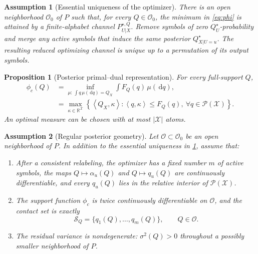 \documentclass[10pt,a4paper]{amsart}
\newtheorem{assumption}{Assumption}
\newtheorem{proposition}{Proposition}
\newcommand{\Pcal}{\mathcal P}
\newcommand{\Scal}{\mathcal S}
\newcommand{\X}{\mathcal X}
\newcommand{\dd}{\,\mathrm d}
\newcommand{\ip}[2]{\left\langle #1,#2\right\rangle}
\begin{document}
\begin{assumption}[Essential uniqueness of the optimizer]
\label{ass:unique}
There is an open neighborhood $\mathcal O_0$ of $P$ such that, for every $Q\in\mathcal O_0$, the minimum in \eqref{eq:phi} is attained by a finite-alphabet channel $P_{U|X}^{\star,Q}$.  Remove symbols of zero $Q_U^{\star}$-probability and merge any active symbols that induce the same posterior $Q_{X|U=u}^{\star}$.  The resulting reduced optimizing channel is unique up to a permutation of its output symbols.
\end{assumption}

\begin{proposition}[Posterior primal--dual representation]
\label{prop:posterior-dual}
For every full-support $Q$,
\begin{align}
\phi_c(Q)
&=\inf_{\mu:\,\int q\,\mu(\dd q)=Q_X}
\int F_Q(q)\,\mu(\dd q),
\label{eq:posterior-primal}\\
&=\max_{\kappa\in\mathbb R^{\X}}
\left\{\ip{Q_X}{\kappa}:\ip{q}{\kappa}\le F_Q(q),\ \forall q\in\Pcal(\X)\right\}.
\label{eq:posterior-dual}
\end{align}
An optimal measure can be chosen with at most $|\X|$ atoms.
\end{proposition}

\begin{assumption}[Regular posterior geometry]
\label{ass:regular}
Let $\mathcal O\subset\mathcal O_0$ be an open neighborhood of $P$.  In addition to the essential uniqueness in \cref{ass:unique}, assume that:
\begin{enumerate}[label=\textup{(\alph*)}]
\item  After a consistent relabeling, the optimizer has a fixed number $m$ of active symbols, the maps $Q\mapsto\alpha_u(Q)$ and $Q\mapsto q_u(Q)$ are continuously differentiable, and every $q_u(Q)$ lies in the relative interior of $\Pcal(\X)$.
\item The support function $\phi_c$ is twice continuously differentiable on $\mathcal O$, and the contact set is exactly
\begin{equation}
\Scal_Q=\{q_1(Q),\ldots,q_m(Q)\},\qquad Q\in\mathcal O.
\label{eq:finite-contact}
\end{equation}
\item The residual variance is nondegenerate: $\sigma^2(Q)>0$ throughout a possibly smaller neighborhood of $P$.
\end{enumerate}
\end{assumption}
\end{document}
